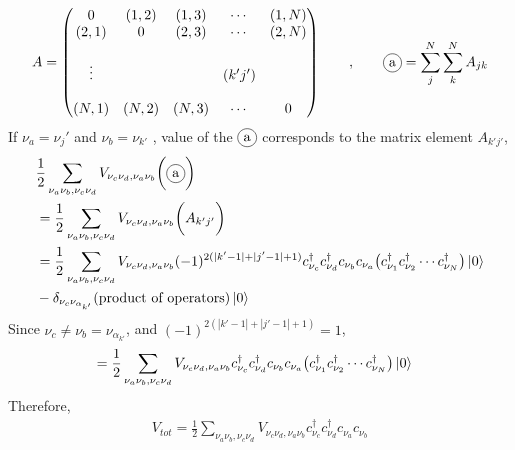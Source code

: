 \documentclass{article}
\newcommand\encircle[1]{%
    \tikz[baseline=(X.base)] 
      \node (X) [draw, shape=circle, inner sep=0] {\strut #1};}
\begin{document}
\begin{align*}
    A= \left(
        \begin{matrix}
            0 & (1,2) & (1,3) & \cdots & (1,N) \\
            (2,1) & 0 & (2,3) & \cdots & (2,N) \\
            \\
            \vdots & & &(k'j') & \\
            \\
            (N,1) & (N,2) & (N,3) & \cdots & 0 \\
        \end{matrix}
      \right)
    \qquad , \qquad \encircle{a} = \sum_{j}^{N}\sum_{k}^{N} A_{jk} \end{align*}
If $\nu_a=\nu_{j}'$ and $\nu_b = \nu_{k'}$ , value of the ${\encircle{a}}$ corresponds to the matrix element $A_{k'j'}$,
\begin{align*}
    &\frac{1}{2}\sum_{\nu_a\nu_b,\nu_c \nu_d} V_{\nu_c\nu_d,\nu_a \nu_b}\bigg(\encircle{a}\bigg) \\ 
    &=\frac{1}{2}\sum_{\nu_a\nu_b,\nu_c \nu_d} V_{\nu_c\nu_d,\nu_a \nu_b}\bigg( A_{k'j'} \bigg) \\
    &=\frac{1}{2}\sum_{\nu_a\nu_b,\nu_c \nu_d} V_{\nu_c\nu_d,\nu_a \nu_b}(-1)^{2(|k'-1|+|j'-1|+1)}c^{\dagger}_{\nu_c}c^{\dagger}_{\nu_d} c_{\nu_b}c_{\nu_a}\big(c^{\dagger}_{\nu_1}c^{\dagger}_{\nu_2} \cdots c^{\dagger}_{\nu_N}\big) \ket{0}\\
    & - \delta_{\nu_c \nu_{\alpha_{k'}}}(\text{product of operators})\ket{0}
\end{align*}
Since $\nu_c \neq \nu_b =\nu_{\alpha_{k'}}$, and $(-1)^{2(|k'-1|+|j'-1|+1)}=1$,
\begin{align*}
    &=\frac{1}{2}\sum_{\nu_a\nu_b,\nu_c \nu_d} V_{\nu_c\nu_d,\nu_a \nu_b} c^{\dagger}_{\nu_c}c^{\dagger}_{\nu_d} c_{\nu_b}c_{\nu_a}\big(c^{\dagger}_{\nu_1}c^{\dagger}_{\nu_2} \cdots c^{\dagger}_{\nu_N}\big) \ket{0}
\end{align*}
Therefore,
\begin{align*}
    V_{tot}=\frac{1}{2}\sum_{\nu_a\nu_b,\nu_c \nu_d} V_{\nu_c\nu_d,\nu_a \nu_b}c^{\dagger}_{\nu_c}c^{\dagger}_{\nu_d}c_{\nu_a}c_{\nu_b}
\end{align*}
\end{document}
